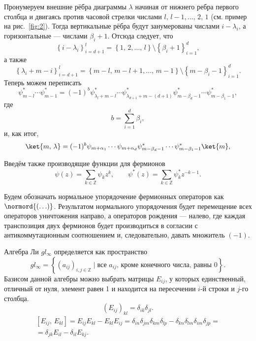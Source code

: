 \documentclass[a5paper,twoside]{article}
\numberwithin{equation}{section}
\begin{document}
Пронумеруем внешние рёбра диаграммы $\lambda$  начиная от нижнего ребра первого столбца и двигаясь против часовой стрелки числами $l,\,l-1,\ldots,\,2,\,1$ (см. пример на рис.~\ref{fig:2}).
Тогда вертикальные рёбра будут занумерованы
числами $i-\lambda_i$, а горизонтальные --- числами
$\beta_i+1$. Отсюда следует, что
\begin{equation}\left\{ i-\lambda_i \right\}_{i=d+1}^{l}=
 \left\{ 1,\,2,\ldots,\,l\right\} \setminus
 \left\{ \beta_i +1 \right\} _{i=1}^{d},\end{equation}
а также
\begin{equation}
\left\{\lambda_i+m-i \right\}_{i=d+1}^{l}=
 \left\{ m-l,\,m-l+1,\ldots,\,m-1 \right\} \setminus
 \left\{ m-\beta_i -1 \right\} _{i=1}^{d}
.\end{equation} 
Теперь можем переписать
\begin{equation}
\psi^*_{m-l}\cdots \psi^*_{m-1}=
(-1)^b \psi^*_{\lambda_l+m-l}\cdots \psi^*_{\lambda_{d+1}+m-(d+1)}
\psi_{m-\beta_d-1}^*\cdots \psi_{m-\beta_1-1}^*
,\end{equation} 
где
\begin{equation}
	b= \sum_{i=1}^{d} \beta_i
,\end{equation} 
и, как итог,
\begin{equation}
	\ket{m,\,\lambda}=(-1)^{b}
	\psi_{m+\alpha_{1}}\cdots
	\psi_{m+\alpha_d}\psi^*_{m-\beta_d -1} \cdots \psi_{m-\beta_{1}-1}^* \ket{m}
,\end{equation} 


Введём также производящие функции для фермионов
\begin{equation}
\psi(z)=\sum _{k\in \mathbb{Z}}^{} \psi_k z^k,\qquad
\psi^* (z)=\sum_{k \in \mathbb{Z}}^{} \psi^*_k z^{-k-1}
.\end{equation} 

Будем обозначать нормальное упорядочение фермионных
операторов как $\normord{\left( \ldots \right) }$.
Результатом нормального упорядочения будет перемещение
всех операторов уничтожения направо, а операторов
рождения --- налево, где каждая транспозиция двух
фермионов будет производиться в согласии с антикоммутационным
соотношением и, следовательно, давать множитель $(-1)$. 

Алгебра Ли $gl_\infty$ определяется как пространство
\begin{equation}
	gl_\infty= \left\{ \left( a_{ij} \right) _{i,j \in \mathbb{Z}}\mid\text{все }a_{ij}\text{, кроме конечного
	числа, равны 0} \right\} 
.\end{equation} 
Базисом данной алгебры можно выбрать матрицы  $E_{ij}$,
у которых единственный, отличный от нуля, элемент равен 1 и находится
на пересечении $i$-й строки и $j$-го столбца.
 \begin{equation}
	(E_{ij})_{kl}=\delta_{ik}\delta_{jl}
.\end{equation} 
\begin{multline}
\left[ E_{ij},\,E_{kl} \right] =
E_{ij}E_{kl}-E_{kl}E_{ij}=
\delta_{in}\delta_{jm}\delta_{km}\delta_{lp}-
\delta_{kn}\delta_{lm}\delta_{im}\delta_{jp}=\\=
\delta_{jk}E_{il}-\delta_{il}E_{kj}
.\end{multline} 
\end{document}
